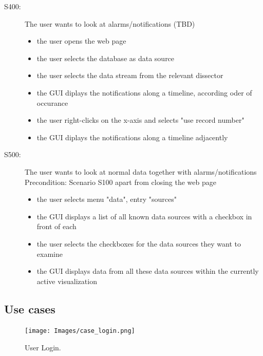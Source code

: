 \documentclass[twoside, english, draft]{Pflichtenheft}
\begin{document}
\begin{description}
	\item[S400:] The user wants to look at alarms/notifications (TBD)
	      \begin{itemize}
		      \item{the user opens the web page}
		      \item{the user selects the database as data source}
		      \item{the user selects the data stream from the relevant dissector}
		      \item{the GUI diplays the notifications along a timeline, according oder of occurance}
		      \item{the user right-clicks on the x-axis and selects "use record number"}
		      \item{the GUI diplays the notifications along a timeline adjacently}
	      \end{itemize}



	\item[S500:] The user wants to look at normal data together with alarms/notifications
	      \\
	      Precondition: Scenario S100 apart from closing the web page
	      \begin{itemize}
		      \item{the user selects menu "data", entry "sources"}
		      \item{the GUI displays a list of all known data sources with a checkbox in front of each}
		      \item{the user selects the checkboxes for the data sources they want to examine}
		      \item{the GUI displays data from all these data sources within the currently active visualization}
	      \end{itemize}


\end{description}

\subsection{Use cases}
\begin{figure}[h]
	\centering
	\texttt{[image: Images/case\_login.png]}
	\caption{User Login.}
\end{figure}
\end{document}
